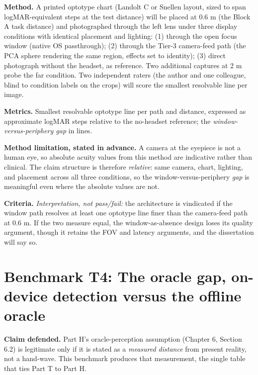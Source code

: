 \textbf{Method.} A printed optotype chart (Landolt C or Snellen layout, sized to span logMAR-equivalent
steps at the test distance) will be placed at 0.6 m (the Block A task distance) and photographed
through the left lens under three display conditions with identical placement and lighting:
(1) through the open focus window (native OS passthrough); (2) through the Tier-3 camera-feed path
(the PCA sphere rendering the same region, effects set to identity); (3) direct photograph without
the headset, as reference. Two additional captures at 2 m probe the far condition. Two independent
raters (the author and one colleague, blind to condition labels on the crops) will score the
smallest resolvable line per image.

\textbf{Metrics.} Smallest resolvable optotype line per path and distance, expressed as approximate
logMAR steps relative to the no-headset reference; the \textit{window-versus-periphery gap} in lines.

\textbf{Method limitation, stated in advance.} A camera at the eyepiece is not a human eye, so
absolute acuity values from this method are indicative rather than clinical. The claim structure is
therefore \textit{relative}: same camera, chart, lighting, and placement across all three conditions, so
the window-versus-periphery \textit{gap} is meaningful even where the absolute values are not.

\textbf{Criteria.} \textit{Interpretation, not pass/fail:} the architecture is vindicated if the window path
resolves at least one optotype line finer than the camera-feed path at 0.6 m. If the two measure
equal, the window-as-absence design loses its quality argument, though it retains the FOV and
latency arguments, and the dissertation will say so.


\section{Benchmark T4: The oracle gap, on-device detection versus the offline oracle}

\textbf{Claim defended.} Part H's oracle-perception assumption (Chapter 6, Section 6.2) is legitimate
only if it is stated as a \textit{measured distance} from present reality, not a hand-wave. This benchmark
produces that measurement, the single table that ties Part T to Part H.

